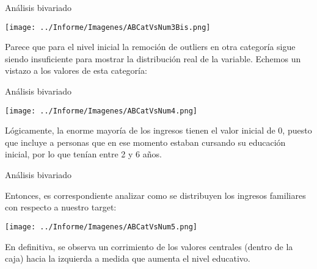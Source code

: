 \documentclass[pdf]{beamer}
\begin{document}
\begin{frame}{Análisis bivariado}

    \begin{center}
        \texttt{[image: ../Informe/Imagenes/ABCatVsNum3Bis.png]}
    \end{center}
    Parece que para el nivel inicial la remoción de outliers en otra categoría sigue siendo insuficiente para mostrar la distribución real de la variable. Echemos un vistazo a los valores de esta categoría:
\end{frame}
 
 
 
\begin{frame}{Análisis bivariado}
    \footnotesize

    \begin{center}
        \texttt{[image: ../Informe/Imagenes/ABCatVsNum4.png]}
    \end{center}

    Lógicamente, la enorme mayoría de los ingresos tienen el valor inicial de 0, puesto que incluye a personas que en ese momento estaban cursando su educación inicial, por lo que tenían entre 2 y 6 años.

\end{frame}

\begin{frame}{Análisis bivariado}

    Entonces, es correspondiente analizar como se distribuyen los ingresos familiares con respecto a nuestro target:

    \begin{center}
        \texttt{[image: ../Informe/Imagenes/ABCatVsNum5.png]}
    \end{center}

    En definitiva, se observa un corrimiento de los valores centrales (dentro de la caja) hacia la izquierda a medida que aumenta el nivel educativo.


\end{frame}
\end{document}
